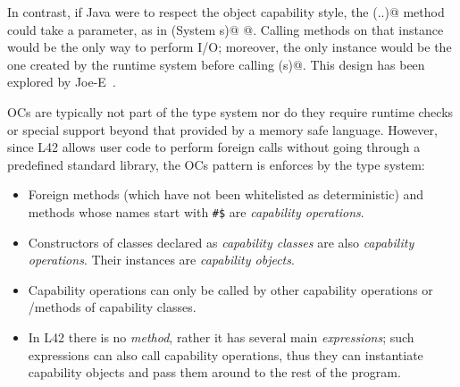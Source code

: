 In contrast, if Java were to respect the object capability style, the \Q@main(..)@ method could take a \Q@System@ parameter, as in
 \Q@main(System s)@
 \lstset{language=Java}
@. \lstset{language=FortyTwo}%
Calling methods on that \Q@System@ instance would be the only way to perform I/O;
moreover, the only \Q@System@ instance would be the one created by the runtime system before calling \Q@main(s)@. %
This design has been explored by Joe-E~\cite{finifter2008verifiable}.


OCs are typically not part of the type system nor do they require runtime checks or special support beyond that provided by a memory safe language. However, since
L42 allows user code to perform foreign calls without going through a predefined standard library, 
the OCs pattern is enforces by the type system:
\begin{itemize}
\item Foreign methods (which have not been whitelisted as deterministic) and methods whose names start with \texttt{\#\$} are \emph{capability operations}.%
\item Constructors of classes declared as \emph{capability classes} are also \emph{capability operations}. Their instances are \emph{capability objects}.
\item Capability operations can only be called by other capability operations or \Q@mut@/\Q@capsule@ methods of capability classes.
\item In L42 there is no \Q@main@ \emph{method}, rather it has several main \emph{expressions}; such expressions can also call capability operations, thus they can instantiate capability objects and pass them around to the rest of the program.

\end{itemize}

